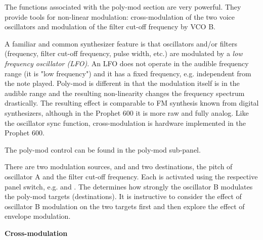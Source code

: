 The functions associated with the poly-mod section are very powerful. They provide tools for non-linear modulation: cross-modulation of the two voice oscillators and modulation of the filter cut-off frequency by VCO B. 

A familiar and common synthesizer feature is that oscillators and/or filters (frequency, filter cut-off frequency, pulse width, etc.) are modulated by a \textit{low frequency oscillator (LFO)}. An LFO does not operate in the audible frequency range (it is "low frequency") and it has a fixed frequency, e.g. independent from the note played. Poly-mod is different in that the modulation itself is in the audible range and the resulting non-linearity changes the frequency spectrum drastically. The resulting effect is comparable to FM synthesis known from digital synthesizers, although in the Prophet 600 it is more raw and fully analog. Like the oscillator sync function, cross-modulation is hardware implemented in the Prophet 600.

The poly-mod control can be found in the poly-mod sub-panel. 

\begin{center}
\end{center}

There are two modulation sources, \polymodenv and \polymodosc and two destinations, the pitch of oscillator A  and the filter cut-off frequency. Each is activated using the respective panel switch, e.g. \polymodfreq and \polymodfilter. The \polymodosc  determines how strongly the oscillator B modulates the poly-mod targets (destinations). It is instructive to consider the effect of oscillator B modulation on the two targets first and then explore the effect of envelope modulation.

\textbf{Cross-modulation}

